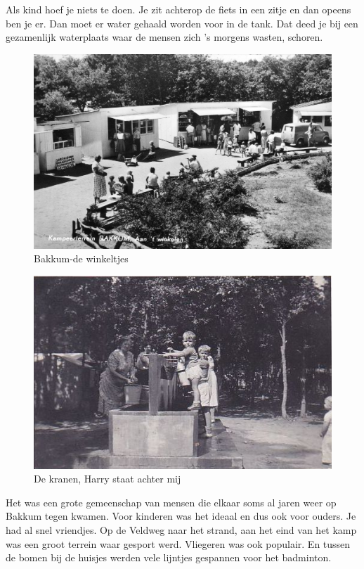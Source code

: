 \documentclass[12pt,twoside, openright]{memoir}
\begin{document}
Als kind hoef je niets te doen. Je zit achterop de fiets in een zitje en dan opeens ben je er. Dan moet er water gehaald worden voor in de tank. Dat deed je bij een gezamenlijk waterplaats waar de mensen zich ’s morgens wasten, schoren. 

\begin{figure}
\centering
\includegraphics[width=\textwidth]{img/winkelplein22.jpg}
\caption*{\footnotesize Bakkum-de winkeltjes}
\end{figure}

\begin{figure}
\centering
\includegraphics[width=\textwidth]{img/Bakkumkranen}
\caption*{\footnotesize De kranen, Harry staat achter mij}
\end{figure} 

Het was een grote gemeenschap van mensen die elkaar soms al jaren weer op Bakkum tegen kwamen.  Voor kinderen was het ideaal en dus ook voor ouders. Je had al snel vriendjes. Op de Veldweg naar het strand, aan het eind van het kamp was een groot terrein waar gesport werd. Vliegeren was ook populair. En tussen de bomen bij de huisjes werden vele lijntjes gespannen voor het badminton.
\end{document}

